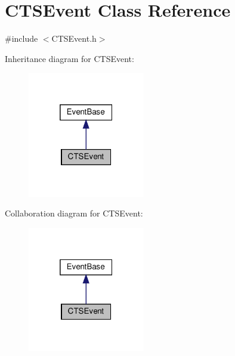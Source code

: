 \hypertarget{classCTSEvent}{}\section{C\+T\+S\+Event Class Reference}
\label{classCTSEvent}


{\ttfamily \#include $<$C\+T\+S\+Event.\+h$>$}



Inheritance diagram for C\+T\+S\+Event\+:\nopagebreak
\begin{figure}[H]
\begin{center}
\leavevmode
\includegraphics[width=145pt]{classCTSEvent__inherit__graph}
\end{center}
\end{figure}


Collaboration diagram for C\+T\+S\+Event\+:\nopagebreak
\begin{figure}[H]
\begin{center}
\leavevmode
\includegraphics[width=145pt]{classCTSEvent__coll__graph}
\end{center}
\end{figure}
